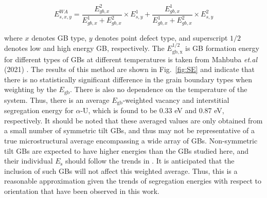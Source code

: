 \documentclass[review]{elsarticle}
\begin{document}
\begin{equation}
\label{eq:weight}
E_{s,x,y}^{WA} = \frac{E_{gb,x}^{2}}{E_{gb,x}^{1}+E_{gb,x}^{2}} \times E_{s,y}^{1} + \frac{E_{gb,x}^{1}}{E_{gb,x}^{1}+E_{gb,x}^{2}} \times E_{s,y}^{2}
\end{equation}

\noindent where $x$ denotes GB type, $y$ denotes point defect type, and superscript $1/2$ denotes low and high energy GB, respectively. The $E_{\mathrm{gb, x}}^{1/2}$ is GB formation energy for different types of GBs at different temperatures is taken from Mahbuba \textit{et.al} (2021) \cite{MAHBUBA2021153072}. The results of this method are shown in Fig.~\ref{fig:SE} and indicate that there is no statistically significant difference in the grain boundary types when weighting by the $E_{\mathrm{gb}}$. There is also no dependence on the temperature of the system. Thus, there is an average $E_{\mathrm{gb}}$-weighted vacancy and interstitial segregation energy for $\alpha$-U, which is found to be 0.33 eV and 0.87 eV, respectively. It should be noted that these averaged values are only obtained from a small number of symmetric tilt GBs, and thus may not be representative of a true microstructural average encompassing a wide array of GBs. Non-symmetric tilt GBs are expected to have higher energies than the GBs studied here, and their individual $E_{\mathrm{s}}$ should follow the trends in . It is anticipated that the inclusion of such GBs will not affect this weighted average. Thus, this is a reasonable approximation given the trends of segregation energies with respect to orientation that have been observed in this work.
\end{document}
